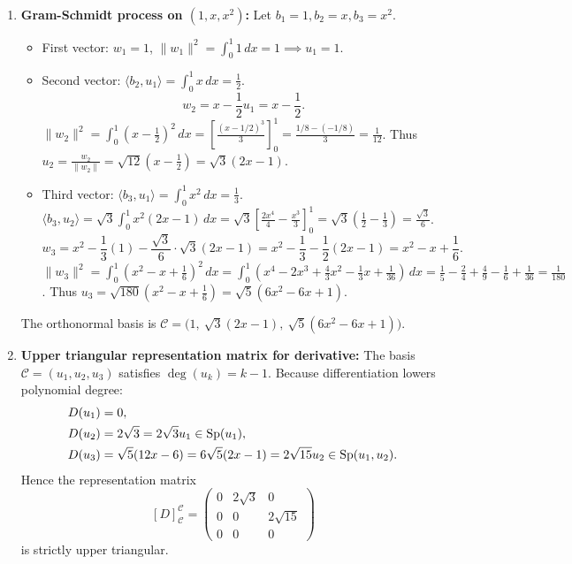 \begin{exercisesolution*}
\label{sol:gram_schmidt_polynomials_derivative}
\begin{enumerate}[label=\textbf{(\alph*)}]
    \item \textbf{Gram-Schmidt process on $(1, x, x^2)$:}
    Let $b_1 = 1, b_2 = x, b_3 = x^2$.
    \begin{itemize}
        \item First vector: $w_1 = 1$, $\|w_1\|^2 = \int_0^1 1\,dx = 1 \implies u_1 = 1$.
        \item Second vector: $\langle b_2, u_1 \rangle = \int_0^1 x\,dx = \frac{1}{2}$.
        \[
        w_2 = x - \frac{1}{2} u_1 = x - \frac{1}{2}.
        \]
        $\|w_2\|^2 = \int_0^1 (x - \frac{1}{2})^2 \, dx = \left[ \frac{(x-1/2)^3}{3} \right]_0^1 = \frac{1/8 - (-1/8)}{3} = \frac{1}{12}$.
        Thus $u_2 = \frac{w_2}{\|w_2\|} = \sqrt{12}(x - \frac{1}{2}) = \sqrt{3}(2x - 1)$.
        \item Third vector:
        $\langle b_3, u_1 \rangle = \int_0^1 x^2\,dx = \frac{1}{3}$.
        $\langle b_3, u_2 \rangle = \sqrt{3} \int_0^1 x^2(2x - 1)\,dx = \sqrt{3} \left[ \frac{2x^4}{4} - \frac{x^3}{3} \right]_0^1 = \sqrt{3}(\frac{1}{2} - \frac{1}{3}) = \frac{\sqrt{3}}{6}$.
        \[
        w_3 = x^2 - \frac{1}{3}(1) - \frac{\sqrt{3}}{6} \cdot \sqrt{3}(2x - 1) = x^2 - \frac{1}{3} - \frac{1}{2}(2x - 1) = x^2 - x + \frac{1}{6}.
        \]
        $\|w_3\|^2 = \int_0^1 (x^2 - x + \frac{1}{6})^2 \, dx = \int_0^1 (x^4 - 2x^3 + \frac{4}{3}x^2 - \frac{1}{3}x + \frac{1}{36})\,dx = \frac{1}{5} - \frac{2}{4} + \frac{4}{9} - \frac{1}{6} + \frac{1}{36} = \frac{1}{180}$.
        Thus $u_3 = \sqrt{180}(x^2 - x + \frac{1}{6}) = \sqrt{5}(6x^2 - 6x + 1)$.
    \end{itemize}
    The orthonormal basis is $\mathcal{C} = \big(1, \ \sqrt{3}(2x-1), \ \sqrt{5}(6x^2 - 6x + 1)\big)$.

    \item \textbf{Upper triangular representation matrix for derivative:}
    The basis $\mathcal{C} = (u_1, u_2, u_3)$ satisfies $\deg(u_k) = k - 1$.
    Because differentiation lowers polynomial degree:
    \begin{align*}
    D(u_1) &= 0, \\
    D(u_2) &= 2\sqrt{3} = 2\sqrt{3} u_1 \in \operatorname{Sp}(u_1), \\
    D(u_3) &= \sqrt{5}(12x - 6) = 6\sqrt{5}(2x - 1) = 2\sqrt{15} u_2 \in \operatorname{Sp}(u_1, u_2).
    \end{align*}
    Hence the representation matrix
    \[
    [D]_\mathcal{C}^\mathcal{C} = \begin{pmatrix} 0 & 2\sqrt{3} & 0 \\ 0 & 0 & 2\sqrt{15} \\ 0 & 0 & 0 \end{pmatrix}
    \]
    is strictly upper triangular. \qedhere
\end{enumerate}
\end{exercisesolution*}
